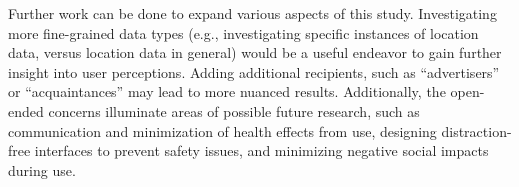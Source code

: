 Further work can be done to expand various aspects of this study. Investigating more fine-grained data types (e.g., investigating specific instances of location data, versus location data in general) would be a useful endeavor to gain further insight into user perceptions. Adding additional recipients, such as ``advertisers'' or ``acquaintances'' may lead to more nuanced results. Additionally, the open-ended concerns illuminate areas of possible future research, such as communication and minimization of health effects from use, designing distraction-free interfaces to prevent safety issues, and minimizing negative social impacts during use. 